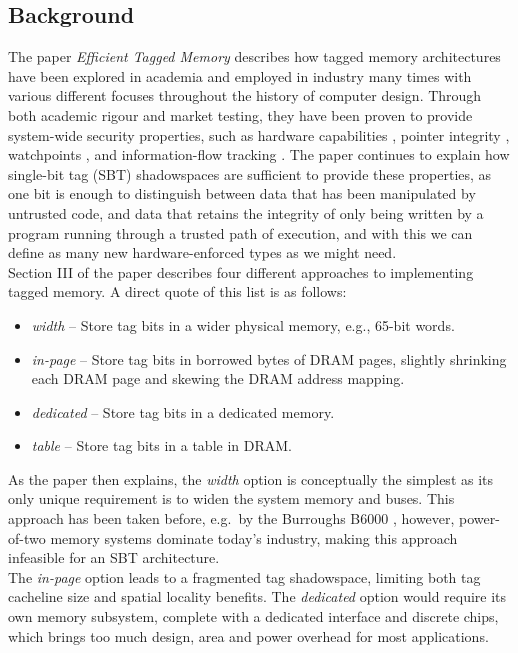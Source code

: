 \documentclass[10pt,a4paper]{article}
\begin{document}
\subsection*{Background}
The paper \textit{Efficient Tagged Memory} \cite{joannou2017efficient} describes how tagged memory architectures have been explored in academia and employed in industry many times with various different focuses throughout the history of computer design. Through both academic rigour and market testing, they have been proven to provide system-wide security properties, such as hardware capabilities \cite{clark1989application}, pointer integrity \cite{crandall2004minos}, watchpoints \cite{greathouse2012case}, and information-flow tracking \cite{suh2004secure}. The paper continues to explain how single-bit tag (SBT) shadowspaces are sufficient to provide these properties, as one bit is enough to distinguish between data that has been manipulated by untrusted code, and data that retains the integrity of only being written by a program running through a trusted path of execution, and with this we can define as many new hardware-enforced types as we might need.\\
Section III of the paper describes four different approaches to implementing tagged memory. A direct quote of this list is as follows:
\begin{itemize}
\item \textit{width} -- Store tag bits in a wider physical memory, e.g., 65-bit words.
\item \textit{in-page} -- Store tag bits in borrowed bytes of DRAM pages, slightly shrinking each DRAM page and skewing the DRAM address mapping.
\item \textit{dedicated} -- Store tag bits in a dedicated memory.
\item \textit{table} -- Store tag bits in a table in DRAM.
\end{itemize}
As the paper then explains, the \textit{width} option is conceptually the simplest as its only unique requirement is to widen the system memory and buses. This approach has been taken before, e.g.\ by the Burroughs B6000 \cite{mayer1982architecture}, however, power-of-two memory systems dominate today's industry, making this approach infeasible for an SBT architecture.\\
The \textit{in-page} option leads to a fragmented tag shadowspace, limiting both tag cacheline size and spatial locality benefits. The \textit{dedicated} option would require its own memory subsystem, complete with a dedicated interface and discrete chips, which brings too much design, area and power overhead for most applications.\\
\end{document}
